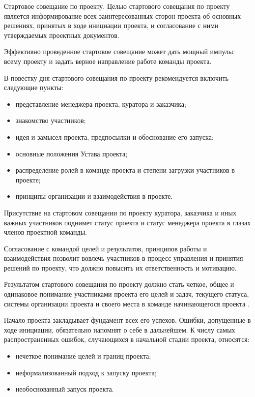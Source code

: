 Стартовое совещание по проекту.
Целью стартового совещания по проекту является информирование всех заинтересованных сторон проекта об основных решениях, приня­тых в ходе инициации проекта, и согласование с ними утверждаемых проектных документов.

Эффективно проведенное стартовое совещание может дать мощный импульс всему проекту и задать верное направление работе команды проекта.

В повестку дня стартового совещания по проекту рекомендуется включить следующие пункты:
\begin{itemize}
	\item представление менеджера проекта, куратора и заказчика;
\item знакомство участников;
\item идея и замысел проекта, предпосылки и обоснование его запуска;
\item основные положения Устава проекта;
\item распределение ролей в команде проекта и степени загрузки участ­ников в проекте;
\item принципы организации и взаимодействия в проекте.
\end{itemize}

Присутствие на стартовом совещании по проекту куратора, заказ­чика и иных важных участников поднимет статус проекта и статус менеджера проекта в глазах членов проектной команды.

Согласование с командой целей и результатов, принципов работы и взаимодействия позволит вовлечь участников в процесс управления и принятия решений по проекту, что должно повысить их ответствен­ность и мотивацию.

Результатом стартового совещания по проекту должно стать четкое, общее и одинаковое понимание участниками проекта его целей и за­дач, текущего статуса, системы организации проекта и своего места в команде начинающегося проекта \cite[145]{polkovnikov}.

Начало проекта закладывает фундамент всех его успехов.
Ошибки, допущенные в ходе инициации, обязательно напомнят о себе в даль­нейшем.
К числу самых распространенных ошибок, случающихся в начальной стадии проекта, относятся:
\begin{itemize}
	\item нечеткое понимание целей и границ проекта;
\item неформализованный подход к запуску проекта;
\item необоснованный запуск проекта.
\end{itemize}

